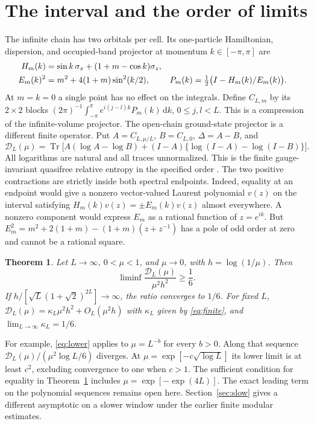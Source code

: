 \documentclass[11pt,letterpaper]{article}
\newtheorem{theorem}{Theorem}
\newcommand{\Tr}{\operatorname{Tr}}
\newcommand{\Id}{I}
\newcommand{\cD}{\mathcal D}
\newcommand{\dd}{\,\mathrm d}
\begin{document}
\section{The interval and the order of limits}
The infinite chain has two orbitals per cell. Its one-particle Hamiltonian, dispersion, and occupied-band projector at momentum \(k\in[-\pi,\pi]\) are
\begin{align}
 H_m(k)&=\sin k\,\sigma_x+(1+m-\cos k)\sigma_z,\notag\\
 E_m(k)^2&=m^2+4(1+m)\sin^2(k/2),&
 P_m(k)&=\tfrac12\bigl(\Id-H_m(k)/E_m(k)\bigr).
 \label{eq:model}
\end{align}
At \(m=k=0\) a single point has no effect on the integrals. Define \(C_{L,m}\) by its \(2\times2\) blocks \((2\pi)^{-1}\int_{-\pi}^{\pi}e^{i(j-l)k}P_m(k)\dd k\), \(0\le j,l<L\). This is a compression of the infinite-volume projector. The open-chain ground-state projector is a different finite operator. Put \(A=C_{L,\mu/L}\), \(B=C_{L,0}\), \(\Delta=A-B\), and
\begin{equation}
 \cD_L(\mu)=\Tr\bigl[A(\log A-\log B)+(\Id-A)
       \{\log(\Id-A)-\log(\Id-B)\}\bigr].
 \label{eq:rel}
\end{equation}
All logarithms are natural and all traces unnormalized. This is the finite gauge-invariant quasifree relative entropy in the specified order \cite{d1}. The two positive contractions are strictly inside both spectral endpoints. Indeed, equality at an endpoint would give a nonzero vector-valued Laurent polynomial \(v(z)\) on the interval satisfying \(H_m(k)v(z)=\pm E_m(k)v(z)\) almost everywhere. A nonzero component would express \(E_m\) as a rational function of \(z=e^{ik}\). But \(E_m^2=m^2+2(1+m)-(1+m)(z+z^{-1})\) has a pole of odd order at zero and cannot be a rational square.

\begin{theorem}\label{thm:main}
Let \(L\to\infty\), \(0<\mu<1\), and \(\mu\to0\), with \(h=\log(1/\mu)\). Then
\begin{equation}
 \liminf\frac{\cD_L(\mu)}{\mu^2h^2}\ge \frac16.
 \label{eq:lower}
\end{equation}
If \(h/[\sqrt L(1+\sqrt2)^{2L}]\to\infty\), the ratio converges to \(1/6\). For fixed \(L\), \(\cD_L(\mu)=\kappa_L\mu^2h^2+O_L(\mu^2h)\) with \(\kappa_L\) given by \eqref{eq:finite}, and \(\lim_{L\to\infty}\kappa_L=1/6\).
\end{theorem}

For example, \eqref{eq:lower} applies to \(\mu=L^{-b}\) for every \(b>0\). Along that sequence \(\cD_L(\mu)/(\mu^2\log L/6)\) diverges. At \(\mu=\exp[-c\sqrt{\log L}]\) its lower limit is at least \(c^2\), excluding convergence to one when \(c>1\). The sufficient condition for equality in Theorem~\ref{thm:main} includes \(\mu=\exp[-\exp(4L)]\). The exact leading term on the polynomial sequences remains open here. Section~\ref{sec:slow} gives a different asymptotic on a slower window under the earlier finite modular estimates.
\end{document}
